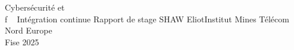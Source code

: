 \documentclass[a4paper,12pt]{report}
\begin{document}
\imtnepagedegarde
    {Cybersécurité et\\\hphantom f \qquad ~ Intégration continue} %
    {Rapport de stage} %
    {SHAW Eliot\vspace{5px}Institut Mines Télécom Nord Europe\\Fise 2025} %

\cleardoublepage


\clearpage

\tableofcontents
\clearpage




\clearpage




\clearpage






\cleardoublepage


\end{document}
